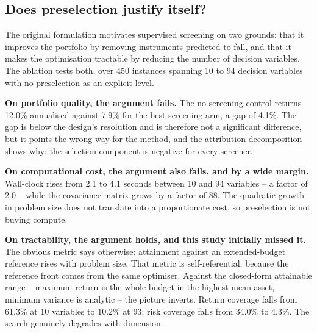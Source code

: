 \documentclass[preprint,11pt,authoryear]{elsarticle}
\begin{document}
\begin{table}[htbp]
  \centering
  \small
  \caption{Return decomposition into market, selection, allocation and currency tilt.}
  \label{tab:attribution}
  
\end{table}

\begin{table}[htbp]
  \centering
  \small
  \caption{The three investor profiles, each against its designated metric.}
  \label{tab:profiles}
  
\end{table}


\subsection{Does preselection justify itself?}\label{sec:screening-justification}

The original formulation motivates supervised screening on two grounds: that it improves the portfolio by removing instruments predicted to fall, and that it makes the optimisation tractable by reducing the number of decision variables. The ablation tests both, over 450 instances spanning 10 to 94 decision variables with no-preselection as an explicit level.

\textbf{On portfolio quality, the argument fails.} The no-screening control returns 12.0\% annualised against 7.9\% for the best screening arm, a gap of 4.1\%. The gap is below the design's resolution and is therefore not a significant difference, but it points the wrong way for the method, and the attribution decomposition shows why: the selection component is negative for every screener.

\textbf{On computational cost, the argument also fails, and by a wide margin.} Wall-clock rises from 2.1 to 4.1 seconds between 10 and 94 variables -- a factor of 2.0 -- while the covariance matrix grows by a factor of 88. The quadratic growth in problem size does not translate into a proportionate cost, so preselection is not buying compute.

\textbf{On tractability, the argument holds, and this study initially missed it.} The obvious metric says otherwise: attainment against an extended-budget reference rises with problem size. That metric is self-referential, because the reference front comes from the same optimiser. Against the closed-form attainable range -- maximum return is the whole budget in the highest-mean asset, minimum variance is analytic -- the picture inverts. Return coverage falls from 61.3\% at 10 variables to 10.2\% at 93; risk coverage falls from 34.0\% to 4.3\%. The search genuinely degrades with dimension.
\end{document}
